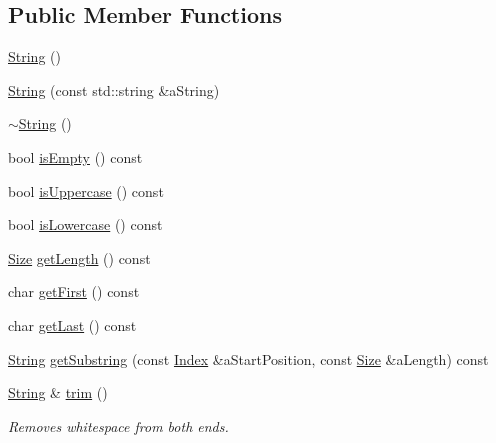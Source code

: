 \subsection*{Public Member Functions}
\begin{DoxyCompactItemize}
\item 
\hyperlink{classlibrary_1_1core_1_1types_1_1_string_ab49dec039a75f0049c95759141b6d484}{String} ()
\item 
\hyperlink{classlibrary_1_1core_1_1types_1_1_string_a37c737528805786c49eab397ba7b64ae}{String} (const std\+::string \&a\+String)
\item 
\hyperlink{classlibrary_1_1core_1_1types_1_1_string_a97f9b0024a58372a0281b25e2811f3bf}{$\sim$\+String} ()
\item 
bool \hyperlink{classlibrary_1_1core_1_1types_1_1_string_a1981fee5619389b46c786afa7aadc251}{is\+Empty} () const
\item 
bool \hyperlink{classlibrary_1_1core_1_1types_1_1_string_a6d12c373b22a062cfa0270204fc998f5}{is\+Uppercase} () const
\item 
bool \hyperlink{classlibrary_1_1core_1_1types_1_1_string_a3620d335dd5b14029a3a67e75c79be81}{is\+Lowercase} () const
\item 
\hyperlink{namespacelibrary_1_1core_1_1types_a701626ea1027888ebbb8cfd0ff7adab0}{Size} \hyperlink{classlibrary_1_1core_1_1types_1_1_string_adc97f82ccc9a3d034bc3127e643199fb}{get\+Length} () const
\item 
char \hyperlink{classlibrary_1_1core_1_1types_1_1_string_ad695264b765448ecf4f8617553012eee}{get\+First} () const
\item 
char \hyperlink{classlibrary_1_1core_1_1types_1_1_string_aae3aaf5e3b3fde3f7b90fd1ee431c9d4}{get\+Last} () const
\item 
\hyperlink{classlibrary_1_1core_1_1types_1_1_string}{String} \hyperlink{classlibrary_1_1core_1_1types_1_1_string_aaf9377048b900766d05a1af9182cf251}{get\+Substring} (const \hyperlink{namespacelibrary_1_1core_1_1types_ad87eeb821d7067ec94e06ed1980d6350}{Index} \&a\+Start\+Position, const \hyperlink{namespacelibrary_1_1core_1_1types_a701626ea1027888ebbb8cfd0ff7adab0}{Size} \&a\+Length) const
\item 
\hyperlink{classlibrary_1_1core_1_1types_1_1_string}{String} \& \hyperlink{classlibrary_1_1core_1_1types_1_1_string_a42426ffb11bb0b2789ba0991064a01b5}{trim} ()
\begin{DoxyCompactList}\small\item\em Removes whitespace from both ends. \end{DoxyCompactList}\end{DoxyCompactItemize}
